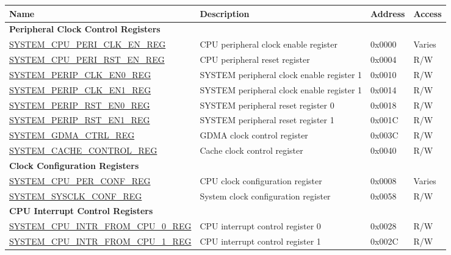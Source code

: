 \begin{longtable}{ | p{6.5cm} | p{6.5cm} | p{1.3cm} | p{1cm} | }
\hline\rowcolor{lightgray}
\textbf{Name} & \textbf{Description} &  \textbf{Address} & \textbf{Access} \\ \hline
\endhead
\multicolumn{4}{|l|}{\textbf{Peripheral Clock Control Registers}} \\ \hline
\hyperref[regdesc:SYSTEMCPUPERICLKENREG]{SYSTEM\_CPU\_PERI\_CLK\_EN\_REG} & CPU peripheral clock enable register & 0x0000 & Varies \\ \hline
\hyperref[regdesc:SYSTEMCPUPERIRSTENREG]{SYSTEM\_CPU\_PERI\_RST\_EN\_REG} & CPU peripheral reset register & 0x0004 & R/W \\ \hline
\hyperref[regdesc:SYSTEMPERIPCLKEN0REG]{SYSTEM\_PERIP\_CLK\_EN0\_REG} & SYSTEM peripheral clock enable register 1 & 0x0010 & R/W \\ \hline
\hyperref[regdesc:SYSTEMPERIPCLKEN1REG]{SYSTEM\_PERIP\_CLK\_EN1\_REG} & SYSTEM peripheral clock enable register 1 & 0x0014 & R/W \\ \hline
\hyperref[regdesc:SYSTEMPERIPRSTEN0REG]{SYSTEM\_PERIP\_RST\_EN0\_REG} & SYSTEM peripheral reset register 0 & 0x0018 & R/W \\ \hline
\hyperref[regdesc:SYSTEMPERIPRSTEN1REG]{SYSTEM\_PERIP\_RST\_EN1\_REG} & SYSTEM peripheral reset register 1 & 0x001C & R/W \\ \hline
\hyperref[regdesc:SYSTEMGDMACTRLREG]{SYSTEM\_GDMA\_CTRL\_REG} & GDMA clock control register & 0x003C & R/W \\ \hline
\hyperref[regdesc:SYSTEMCACHECONTROLREG]{SYSTEM\_CACHE\_CONTROL\_REG} & Cache clock control register & 0x0040 & R/W \\ \hline
\multicolumn{4}{|l|}{\textbf{Clock Configuration Registers}} \\ \hline
\hyperref[regdesc:SYSTEMCPUPERCONFREG]{SYSTEM\_CPU\_PER\_CONF\_REG} & CPU clock configuration register & 0x0008 & Varies \\ \hline
\hyperref[regdesc:SYSTEMSYSCLKCONFREG]{SYSTEM\_SYSCLK\_CONF\_REG} & System clock configuration register & 0x0058 & R/W \\ \hline
\multicolumn{4}{|l|}{\textbf{CPU Interrupt Control Registers}} \\ \hline
\hyperref[regdesc:SYSTEMCPUINTRFROMCPU0REG]{SYSTEM\_CPU\_INTR\_FROM\_CPU\_0\_REG} & CPU interrupt control register 0 & 0x0028 & R/W \\ \hline
\hyperref[regdesc:SYSTEMCPUINTRFROMCPU1REG]{SYSTEM\_CPU\_INTR\_FROM\_CPU\_1\_REG} & CPU interrupt control register 1 & 0x002C & R/W \\ \hline

\end{longtable}
